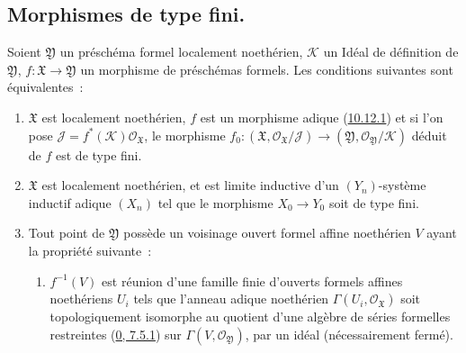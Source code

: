 \subsection{Morphismes de type fini.}
\label{subsection:I.10.13-fr}

\begin{proposition}[10.13.1]
\label{I.10.13.1-fr}
Soient $\mathfrak{Y}$ un préschéma formel localement noethérien,
$\mathscr{K}$ un Idéal de définition de $\mathfrak{Y}$,
$f:\mathfrak{X}\to\mathfrak{Y}$ un morphisme de préschémas formels. Les
conditions suivantes sont équivalentes~:
\begin{enumerate}
  \item[a)] $\mathfrak{X}$ est localement noethérien, $f$ est un morphisme
    adique (\hyperref[I.10.12.1-fr]{10.12.1}) et si l'on pose
    $\mathscr{J}=f^*(\mathscr{K})\mathscr{O}_{\mathfrak{X}}$, le morphisme
    $f_0:(\mathfrak{X},\mathscr{O}_{\mathfrak{X}}/\mathscr{J})
    \to(\mathfrak{Y},\mathscr{O}_{\mathfrak{Y}}/\mathscr{K})$ déduit de
    $f$ est de type fini.
  \item[b)] $\mathfrak{X}$ est localement noethérien, et est limite
    inductive d'un $(Y_n)$-système inductif adique $(X_n)$ tel que le
    morphisme $X_0\to Y_0$ soit de type fini.


  \item[c)] Tout point de $\mathfrak{Y}$ possède un voisinage ouvert formel
    affine noethérien $V$ ayant la propriété suivante~:
    \begin{enumerate}
      \item[(\textbf{Q})] $f^{-1}(V)$ est réunion d'une famille finie
        d'ouverts formels affines noethériens $U_i$ tels que l'anneau adique
        noethérien $\Gamma(U_i,\mathscr{O}_{\mathfrak{X}})$ soit
        topologiquement isomorphe au quotient d'une algèbre de séries
        formelles restreintes (\hyperref[0.7.5.1-fr]{0, 7.5.1}) sur
        $\Gamma(V,\mathscr{O}_{\mathfrak{Y}})$, par un idéal (nécessairement
        fermé).
    \end{enumerate}
\end{enumerate}
\end{proposition}

